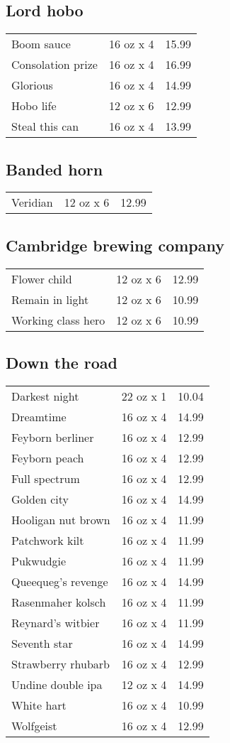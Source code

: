 \documentclass{article}%
\begin{document}
\begin{multicols}{3}
%
\subsection*{Lord hobo}%
\begin{tabular}{l c r}%
Boom sauce&16 oz x 4&15.99\\%
Consolation prize&16 oz x 4&16.99\\%
Glorious&16 oz x 4&14.99\\%
Hobo life&12 oz x 6&12.99\\%
Steal this can&16 oz x 4&13.99\\%
\end{tabular}

%
\subsection*{Banded horn}%
\begin{tabular}{l c r}%
Veridian&12 oz x 6&12.99\\%
\end{tabular}

%
\subsection*{Cambridge brewing company}%
\begin{tabular}{l c r}%
Flower child&12 oz x 6&12.99\\%
Remain in light&12 oz x 6&10.99\\%
Working class hero&12 oz x 6&10.99\\%
\end{tabular}

%
\subsection*{Down the road}%
\begin{tabular}{l c r}%
Darkest night&22 oz x 1&10.04\\%
Dreamtime&16 oz x 4&14.99\\%
Feyborn berliner&16 oz x 4&12.99\\%
Feyborn peach&16 oz x 4&12.99\\%
Full spectrum&16 oz x 4&12.99\\%
Golden city&16 oz x 4&14.99\\%
Hooligan nut brown&16 oz x 4&11.99\\%
Patchwork kilt&16 oz x 4&11.99\\%
Pukwudgie&16 oz x 4&11.99\\%
Queequeg's revenge&16 oz x 4&14.99\\%
Rasenmaher kolsch&16 oz x 4&11.99\\%
Reynard's witbier&16 oz x 4&11.99\\%
Seventh star&16 oz x 4&14.99\\%
Strawberry rhubarb&16 oz x 4&12.99\\%
Undine double ipa&12 oz x 4&14.99\\%
White hart&16 oz x 4&10.99\\%
Wolfgeist&16 oz x 4&12.99\\%
\end{tabular}


\end{multicols}
\end{document}
